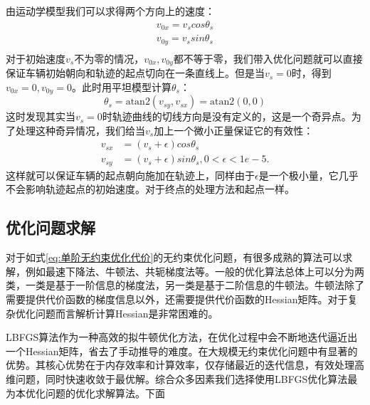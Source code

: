 \documentclass[master,academic]{ysuthesis} %
\begin{document}
		由运动学模型我们可以求得两个方向上的速度：
		\begin{equation}
			\begin{aligned}
				v_{0x}=v_scos\theta _s\\
				v_{0y}=v_ssin\theta _s\\
			\end{aligned}
		\end{equation}
		对于初始速度$v_s$不为零的情况，$v_{0x},v_{0y}$都不等于零，我们带入优化问题就可以直接保证车辆初始朝向和轨迹的起点切向在一条直线上。但是当$v_{s}=0$时，得到$v_{0x}=0,v_{0y}=0$。此时用平坦模型计算$\theta_s$：
		\begin{equation}
			\theta_s=\text{atan}2\left( v_{sy},v_{sx} \right) =\text{atan}2\left( 0,0 \right) 
		\end{equation}
		这时发现其实当$v_{s}=0$时轨迹曲线的切线方向是没有定义的，这是一个奇异点。为了处理这种奇异情况，我们给当$v_{s}$加上一个微小正量保证它的有效性：
		\begin{equation}
			\begin{aligned}
			v_{sx}&=\left( v_s+\epsilon \right) cos\theta_s\\
			v_{sy}&=\left( v_s+\epsilon \right) sin\theta_s,0<\epsilon <1e-5.
			\end{aligned}
		\end{equation}
		这样就可以保证车辆的起点朝向施加在轨迹上，同样由于$\epsilon$是一个极小量，它几乎不会影响轨迹起点的初始速度。对于终点的处理方法和起点一样。

		\subsection{优化问题求解}
		对于如式\ref{eq:单阶无约束优化代价}的无约束优化问题，有很多成熟的算法可以求解，例如最速下降法、牛顿法、共轭梯度法等。一般的优化算法总体上可以分为两类，一类是基于一阶信息的梯度法，另一类是基于二阶信息的牛顿法。牛顿法除了需要提供代价函数的梯度信息以外，还需要提供代价函数的Hessian矩阵。对于复杂优化问题而言解析计算Hessian是非常困难的。
		
		LBFGS算法作为一种高效的拟牛顿优化方法，在优化过程中会不断地迭代逼近出一个Hessian矩阵，省去了手动推导的难度。在大规模无约束优化问题中有显著的优势。其核心优势在于内存效率和计算效率，仅存储最近的迭代信息，有效处理高维问题，同时快速收敛于最优解。综合众多因素我们选择使用LBFGS优化算法最为本优化问题的优化求解算法。下面
\end{document}
